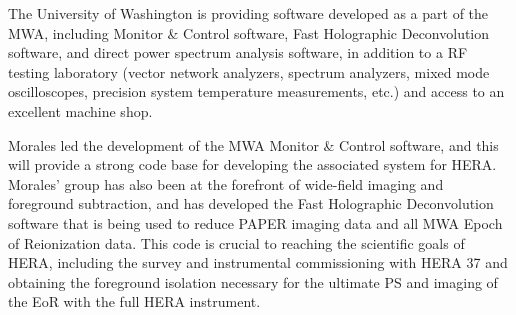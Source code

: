 \documentclass[11pt]{article}
\begin{document}
The University of Washington is providing software developed as a part of the
MWA, including Monitor \& Control software, Fast Holographic Deconvolution
software, and direct power spectrum analysis software, in addition to a RF
testing laboratory (vector network analyzers, spectrum analyzers, mixed mode
oscilloscopes, precision system temperature measurements, etc.) and access to
an excellent machine shop.

Morales led the development of the MWA Monitor \& Control software, and this
will provide a strong code base for developing the associated system for HERA.
Morales' group has also been at the forefront of wide-field imaging and
foreground subtraction, and has developed the Fast Holographic Deconvolution
software that is being used to reduce PAPER imaging data and all MWA Epoch of
Reionization data. This code is crucial to reaching the scientific goals of
HERA, including the survey and instrumental commissioning with HERA 37 and
obtaining the foreground isolation necessary for the ultimate PS and imaging of
the EoR with the full HERA instrument.
\end{document}
